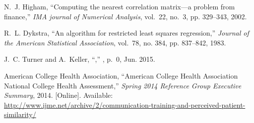 \documentclass[journal,compsoc]{IEEEtran}
\begin{document}
\begin{thebibliography}{10}
N.~J. Higham, ``Computing the nearest correlation matrix—a problem from
  finance,'' \emph{IMA journal of Numerical Analysis}, vol.~22, no.~3, pp.
  329--343, 2002.

R.~L. Dykstra, ``An algorithm for restricted least squares regression,''
  \emph{Journal of the American Statistical Association}, vol.~78, no. 384, pp.
  837--842, 1983.

J.~C. Turner and A.~Keller, ``,''
  \emph{}, p.~0, Jun. 2015.

\BIBentryALTinterwordspacing
{American College Health Association}, ``{American College Health Association
  National College Health Assessment},'' \emph{Spring 2014 Reference Group
  Executive Summary}, 2014. [Online]. Available:
  \url{http://www.ijme.net/archive/2/communication-training-and-perceived-patient-similarity/}
\BIBentrySTDinterwordspacing

\end{thebibliography}
\end{document}
